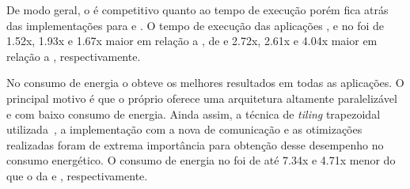 De modo geral, o \pskelmppa \async é competitivo quanto ao tempo de execução porém fica atrás das implementações para \cpu e \gpu. O tempo de execução das aplicações \convolution, \gol e \jacobi no \mppa foi de 1.52x, 1.93x e 1.67x maior em relação a \cpu, de  e 2.72x, 2.61x e 4.04x maior em relação a \gpu, respectivamente.

No consumo de energia o \pskelmppa \async obteve os melhores resultados em todas as aplicações. O principal motivo é que o próprio \mppa oferece uma arquitetura altamente paralelizável e com baixo consumo de energia. Ainda assim, a técnica de \textit{tiling} trapezoidal utilizada~\cite{Podesta:TCC}, a implementação com a nova \api de comunicação \async e as otimizações realizadas foram de extrema importância para obtenção desse desempenho no consumo energético. O consumo de energia no \mppa foi de até 7.34x e 4.71x menor do que o da \cpu e \gpu, respectivamente.


